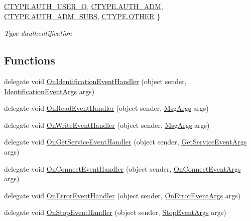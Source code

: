 \begin{DoxyCompactItemize}
\mbox{\hyperlink{namespace_n_t_k_a8fa28c7c4270bbb81ee96b4f632fdbecac2b2e98a9b994501f725f3c9dadfa70a}{C\+T\+Y\+P\+E.\+A\+U\+T\+H\+\_\+\+U\+S\+E\+R\+\_\+O}}, 
\mbox{\hyperlink{namespace_n_t_k_a8fa28c7c4270bbb81ee96b4f632fdbecaadea82eabb902dab5d66eb4081418aec}{C\+T\+Y\+P\+E.\+A\+U\+T\+H\+\_\+\+A\+DM}}, 
\mbox{\hyperlink{namespace_n_t_k_a8fa28c7c4270bbb81ee96b4f632fdbeca51a3af741bbacd7bc77fddfc2160e569}{C\+T\+Y\+P\+E.\+A\+U\+T\+H\+\_\+\+A\+D\+M\+\_\+\+S\+U\+BS}}, 
\newline
\mbox{\hyperlink{namespace_n_t_k_a8fa28c7c4270bbb81ee96b4f632fdbeca03570470bad94692ce93e32700d2e1cb}{C\+T\+Y\+P\+E.\+O\+T\+H\+ER}}
 \}
\begin{DoxyCompactList}\small\item\em Type d\textquotesingle{}authentification \end{DoxyCompactList}\end{DoxyCompactItemize}
\subsection*{Functions}
\begin{DoxyCompactItemize}
\item 
delegate void \mbox{\hyperlink{namespace_n_t_k_a7691450f3d18d3bd04ffaf0a7b564b52}{On\+Identification\+Event\+Handler}} (object sender, \mbox{\hyperlink{class_n_t_k_1_1_events_args_1_1_identification_event_args}{Identification\+Event\+Args}} args)
\item 
delegate void \mbox{\hyperlink{namespace_n_t_k_a9fd65121d09e11207741ba8765106f70}{On\+Read\+Event\+Handler}} (object sender, \mbox{\hyperlink{class_n_t_k_1_1_events_args_1_1_msg_args}{Msg\+Args}} args)
\item 
delegate void \mbox{\hyperlink{namespace_n_t_k_a664e2a81c1b642a3270f33d0848ac27e}{On\+Write\+Event\+Handler}} (object sender, \mbox{\hyperlink{class_n_t_k_1_1_events_args_1_1_msg_args}{Msg\+Args}} args)
\item 
delegate void \mbox{\hyperlink{namespace_n_t_k_af8c7a0dee9d2b4d395e6d806229d2d4f}{On\+Get\+Service\+Event\+Handler}} (object sender, \mbox{\hyperlink{class_n_t_k_1_1_events_args_1_1_get_service_event_args}{Get\+Service\+Event\+Args}} args)
\item 
delegate void \mbox{\hyperlink{namespace_n_t_k_a8743f7b779ee57a52d3757cd46ea0060}{On\+Connect\+Event\+Handler}} (object sender, \mbox{\hyperlink{class_n_t_k_1_1_events_args_1_1_on_connect_event_args}{On\+Connect\+Event\+Args}} args)
\item 
delegate void \mbox{\hyperlink{namespace_n_t_k_a41f1f90439f13a48e64026ed730a1df8}{On\+Error\+Event\+Handler}} (object sender, \mbox{\hyperlink{class_n_t_k_1_1_events_args_1_1_on_error_event_args}{On\+Error\+Event\+Args}} args)
\item 
delegate void \mbox{\hyperlink{namespace_n_t_k_ac2573df1e8f9ef401f201a96c0333d92}{On\+Stop\+Event\+Handler}} (object sender, \mbox{\hyperlink{class_n_t_k_1_1_events_args_1_1_stop_event_args}{Stop\+Event\+Args}} args)
\end{DoxyCompactItemize}


